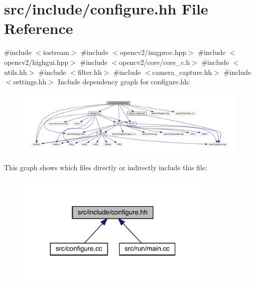 \hypertarget{configure_8hh}{}\section{src/include/configure.hh File Reference}
\label{configure_8hh}
{\ttfamily \#include $<$iostream$>$}\newline
{\ttfamily \#include $<$opencv2/imgproc.\+hpp$>$}\newline
{\ttfamily \#include $<$opencv2/highgui.\+hpp$>$}\newline
{\ttfamily \#include $<$opencv2/core/core\+\_\+c.\+h$>$}\newline
{\ttfamily \#include $<$utils.\+hh$>$}\newline
{\ttfamily \#include $<$filter.\+hh$>$}\newline
{\ttfamily \#include $<$camera\+\_\+capture.\+hh$>$}\newline
{\ttfamily \#include $<$settings.\+hh$>$}\newline
Include dependency graph for configure.\+hh\+:
\nopagebreak
\begin{figure}[H]
\begin{center}
\leavevmode
\includegraphics[width=350pt]{configure_8hh__incl}
\end{center}
\end{figure}
This graph shows which files directly or indirectly include this file\+:
\nopagebreak
\begin{figure}[H]
\begin{center}
\leavevmode
\includegraphics[width=268pt]{configure_8hh__dep__incl}
\end{center}
\end{figure}
